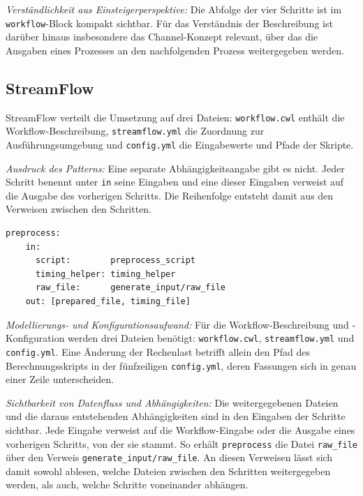 \emph{Verständlichkeit aus Einsteigerperspektive:} Die Abfolge der
vier Schritte ist im \texttt{workflow}-Block kompakt sichtbar. Für das
Verständnis der Beschreibung ist darüber hinaus insbesondere das
Channel-Konzept relevant, über das die Ausgaben eines Prozesses an
den nachfolgenden Prozess weitergegeben werden.

\subsection{StreamFlow}
\label{sec:lokal:pipeline:streamflow}

StreamFlow verteilt die Umsetzung auf drei Dateien:
\texttt{workflow.cwl} enthält die Workflow-Beschreibung,
\texttt{streamflow.yml} die Zuordnung zur Ausführungsumgebung und
\texttt{config.yml} die Eingabewerte und Pfade der Skripte.

\emph{Ausdruck des Patterns:} Eine separate Abhängigkeitsangabe gibt
es nicht. Jeder Schritt benennt unter \texttt{in} seine Eingaben und
eine dieser Eingaben verweist auf die Ausgabe des vorherigen
Schritts. Die Reihenfolge entsteht damit aus den Verweisen zwischen
den Schritten.

\begin{lstlisting}[caption={Verweis auf die Ausgabe des Vorgängers in workflow.cwl (StreamFlow, Pipeline)},label={lst:pipe:sf}]
  preprocess:
    in:
      script:        preprocess_script
      timing_helper: timing_helper
      raw_file:      generate_input/raw_file
    out: [prepared_file, timing_file]
\end{lstlisting}

\emph{Modellierungs- und Konfigurationsaufwand:} Für die
Workflow-Beschreibung und -Konfiguration werden drei Dateien
benötigt: \texttt{workflow.cwl}, \texttt{streamflow.yml} und
\texttt{config.yml}. Eine Änderung der Rechenlast betrifft allein
den Pfad des Berechnungsskripts in der fünfzeiligen
\texttt{config.yml}, deren Fassungen sich in genau einer Zeile
unterscheiden.

\emph{Sichtbarkeit von Datenfluss und Abhängigkeiten:} Die
weitergegebenen Dateien und die daraus entstehenden Abhängigkeiten
sind in den Eingaben der Schritte sichtbar. Jede Eingabe verweist
auf die Workflow-Eingabe oder die Ausgabe eines vorherigen Schritts,
von der sie stammt. So erhält \texttt{preprocess} die Datei
\texttt{raw\_file} über den Verweis
\texttt{generate\_input/raw\_file}. An diesen Verweisen lässt sich
damit sowohl ablesen, welche Dateien zwischen den Schritten
weitergegeben werden, als auch, welche Schritte voneinander
abhängen.

